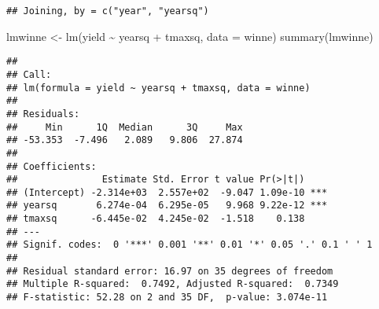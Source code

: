 \documentclass[
]{book}
\newenvironment{Shaded}{\begin{snugshade}}{\end{snugshade}}
\newcommand{\AttributeTok}[1]{\textcolor[rgb]{0.77,0.63,0.00}{#1}}
\newcommand{\FunctionTok}[1]{\textcolor[rgb]{0.00,0.00,0.00}{#1}}
\newcommand{\NormalTok}[1]{#1}
\newcommand{\OtherTok}[1]{\textcolor[rgb]{0.56,0.35,0.01}{#1}}
\newcommand{\SpecialCharTok}[1]{\textcolor[rgb]{0.00,0.00,0.00}{#1}}
\begin{document}
\begin{verbatim}
## Joining, by = c("year", "yearsq")
\end{verbatim}

\begin{Shaded}
\begin{Highlighting}[]
\NormalTok{lmwinne }\OtherTok{\textless{}{-}} \FunctionTok{lm}\NormalTok{(yield }\SpecialCharTok{\textasciitilde{}}\NormalTok{ yearsq }\SpecialCharTok{+}\NormalTok{ tmaxsq, }\AttributeTok{data =}\NormalTok{ winne)}
\FunctionTok{summary}\NormalTok{(lmwinne)}
\end{Highlighting}
\end{Shaded}

\begin{verbatim}
## 
## Call:
## lm(formula = yield ~ yearsq + tmaxsq, data = winne)
## 
## Residuals:
##     Min      1Q  Median      3Q     Max 
## -53.353  -7.496   2.089   9.806  27.874 
## 
## Coefficients:
##               Estimate Std. Error t value Pr(>|t|)    
## (Intercept) -2.314e+03  2.557e+02  -9.047 1.09e-10 ***
## yearsq       6.274e-04  6.295e-05   9.968 9.22e-12 ***
## tmaxsq      -6.445e-02  4.245e-02  -1.518    0.138    
## ---
## Signif. codes:  0 '***' 0.001 '**' 0.01 '*' 0.05 '.' 0.1 ' ' 1
## 
## Residual standard error: 16.97 on 35 degrees of freedom
## Multiple R-squared:  0.7492, Adjusted R-squared:  0.7349 
## F-statistic: 52.28 on 2 and 35 DF,  p-value: 3.074e-11
\end{verbatim}
\end{document}

